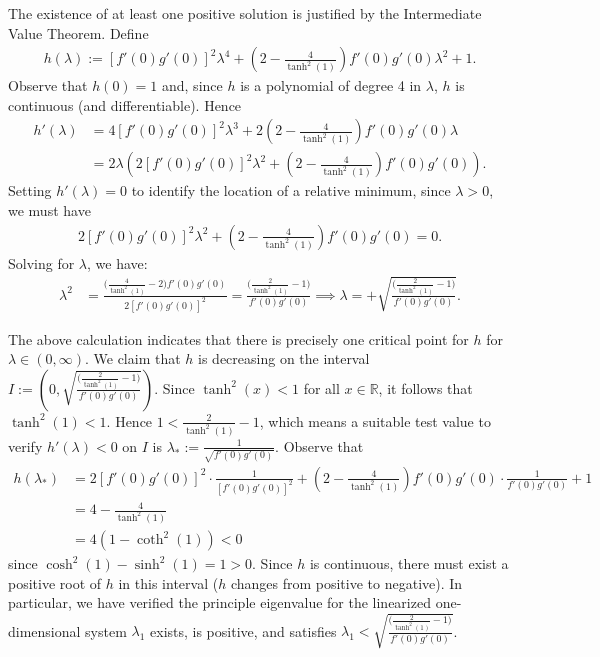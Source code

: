 \documentclass[12pt, reqno]{amsart}
\numberwithin{equation}{section}
\begin{document}
The existence of at least one positive solution is justified by the Intermediate Value Theorem. Define
\begin{align*}
    h(\lambda) := \left[ f'(0) g'(0) \right]^2 \lambda^4 
        + \left( 2 - \frac{4}{\tanh^2(1)} \right) f'(0) g'(0) \lambda^2 
        + 1.
\end{align*}
Observe that $h(0) = 1$ and, since $h$ is a polynomial of degree 4 in $\lambda$, $h$ is continuous (and differentiable). Hence
\begin{align*}
    h'(\lambda) &= 4 [f'(0)g'(0)]^2 \lambda^3 +
                   2 \left( 2 - \frac{4}{\tanh^2(1)} \right) f'(0) g'(0) \lambda  \\
                &= 2\lambda \left( 2[f'(0)g'(0)]^2 
                   \lambda^2 + \left( 2 - \frac{4}{\tanh^2(1)} \right) f'(0) g'(0) \right).
\end{align*}
Setting $h'(\lambda) = 0$ to identify the location of a relative minimum, since $\lambda > 0$, we must have 
\begin{align*}
    2[f'(0)g'(0)]^2 \lambda^2 + \left( 2 - \frac{4}{\tanh^2(1)} \right) f'(0) g'(0) = 0.
\end{align*}
Solving for $\lambda$, we have:
\begin{align*}
    \lambda^2 &= \frac{\Big(\frac{4}{\tanh^2(1)}-2 
                 \Big) f'(0) g'(0)}{2 [f'(0)g'(0)]^2}
              = \frac{\Big(\frac{2}{\tanh^2(1)}-1 
                 \Big)}{f'(0)g'(0)}
            \implies 
    \lambda = +\sqrt{\frac{\Big(\frac{2}{\tanh^2(1)}-1 
                 \Big)}{f'(0)g'(0)}}.
\end{align*}

The above calculation indicates that there is precisely one critical point for $h$ for $\lambda \in (0,\infty)$. We claim that $h$ is decreasing on the interval $I := \left( 0, \sqrt{\frac{\Big(\frac{2}{\tanh^2(1)}-1 \Big)}{f'(0)g'(0)}} \right)$. Since $\tanh^2(x) < 1$ for all $x \in \mathbb{R}$, it follows that $\tanh^2(1) < 1$. Hence $1 < \displaystyle \frac{2}{\tanh^2(1)}-1$, which means a suitable test value to verify $h'(\lambda) < 0$ on $I$ is $\lambda_{*} := \displaystyle \frac{1}{\sqrt{f'(0)g'(0)}}$. Observe that
\begin{align*}
h(\lambda_{*}) 
        &= 2[f'(0)g'(0)]^2 \cdot \frac{1} 
           {[f'(0)g'(0)]^2} + \left( 2 - \frac{4}{\tanh^2(1)} \right) f'(0) g'(0) 
           \cdot \frac{1}{f'(0)g'(0)} + 1 \\
        &= 4 - \frac{4}{\tanh^2(1)} \\
        &= 4 \left( 1 - \coth^2(1) \right)
        < 0
\end{align*}
since $\cosh^2(1) - \sinh^2(1) = 1 > 0$. Since $h$ is continuous, there must exist a positive root of $h$ in this interval ($h$ changes from positive to negative).
In particular, we have verified the principle eigenvalue for the linearized one-dimensional system $\lambda_1$ exists, is positive, and satisfies  $\lambda_1 < \sqrt{\frac{\Big(\frac{2}{\tanh^2(1)}-1 \Big)}{f'(0)g'(0)}}$. \\
\end{document}
